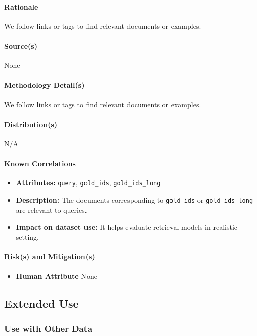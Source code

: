 \paragraph{Rationale}
We follow links or tags to find relevant documents or examples.

\paragraph{Source(s)}
None

\paragraph{Methodology Detail(s)}
We follow links or tags to find relevant documents or examples.

\paragraph{Distribution(s)}
N/A

\paragraph{Known Correlations}
\begin{itemize}
    \item \textbf{Attributes:} \texttt{query}, \texttt{gold\_ids}, \texttt{gold\_ids\_long}
    \item \textbf{Description:} The documents corresponding to \texttt{gold\_ids} or \texttt{gold\_ids\_long} are relevant to queries.
    \item \textbf{Impact on dataset use:} It helps evaluate retrieval models in realistic setting.
\end{itemize}

\paragraph{Risk(s) and Mitigation(s)}
\begin{itemize}
\item \textbf{Human Attribute}
None
\end{itemize}

\subsection{Extended Use}

\subsubsection{Use with Other Data}

